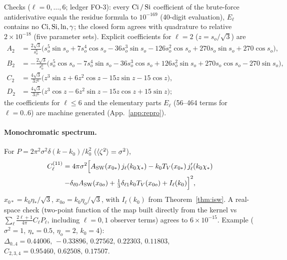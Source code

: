 Checks ($\ell=0,\dots,6$; ledger FO-3): every $\operatorname{Ci}/\operatorname{Si}$ coefficient of the brute-force antiderivative equals the residue
formula to $10^{-169}$ (40-digit evaluation), $E_\ell$ contains no $\operatorname{Ci},\operatorname{Si},\ln,\gamma$; the closed form agrees with quadrature
to relative $2\times10^{-18}$ (five parameter sets).  Explicit coefficients for $\ell=2$ ($z=s_o/\sqrt3$) are
\begin{align*}
A_2&=\tfrac{2\sqrt3}{s_o^6}\big(s_o^5\sin s_o+7s_o^4\cos s_o-36s_o^3\sin s_o-126s_o^2\cos s_o+270s_o\sin s_o+270\cos s_o\big),\\
B_2&=-\tfrac{2\sqrt3}{s_o^6}\big(s_o^5\cos s_o-7s_o^4\sin s_o-36s_o^3\cos s_o+126s_o^2\sin s_o+270s_o\cos s_o-270\sin s_o\big),\\
C_2&=\tfrac{4\sqrt3}{3z^6}\big(z^3\sin z+6z^2\cos z-15z\sin z-15\cos z\big),\\
D_2&=\tfrac{4\sqrt3}{3z^6}\big(z^3\cos z-6z^2\sin z-15z\cos z+15\sin z\big);
\end{align*}
the coefficients for $\ell\le6$ and the elementary parts $E_\ell$ (56--464 terms for $\ell=0..6$) are machine generated (App.~\ref{app:repro}).

\paragraph{Monochromatic spectrum.}  For $P=2\pi^2\sigma^2\delta(k-k_0)/k_0^2$ ($\langle \zeta^2\rangle=\sigma^2$),
\begin{multline}
C_\ell^{(11)}=4\pi\sigma^2\Big[A_{\rm SW}(x_{0*})\,j_\ell(k_0\chi_*)-k_0T_V(x_{0*})\,j'_\ell(k_0\chi_*)\\
-\delta_{\ell0}A_{\rm SW}(x_{0o})+\tfrac13\delta_{\ell1}k_0T_V(x_{0o})+I_\ell(k_0)\Big]^2,
\end{multline}
$x_{0*}=k_0\eta_*/\sqrt3$, $x_{0o}=k_0\eta_o/\sqrt3$, with $I_\ell(k_0)$ from Theorem~\ref{thm:isw}.  A real-space check (two-point function
of the map built directly from the kernel vs $\sum_\ell\frac{2\ell+1}{4\pi}C_\ell P_\ell$, including $\ell=0,1$ observer terms) agrees to
$6\times10^{-15}$.  Example ($\sigma^2=1$, $\eta_*=0.5$, $\eta_o=2$, $k_0=4$): $\Delta_{0..4}=0.44006,\,-0.33896,\,0.27562,\,0.22303,\,0.11803$,
$C_{2,3,4}=0.95460,\,0.62508,\,0.17507$.

